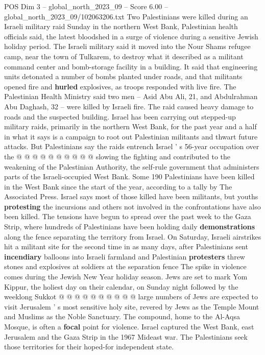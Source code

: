 \begin{textsample}{POS Dim 3 – global\_north\_2023\_09 – Score 6.00 – global\_north\_2023\_09/102063206.txt}  \label{ex:f3_pos_048}
Two Palestinians were killed during an Israeli military raid Sunday in the northern West Bank, Palestinian health officials said, the latest bloodshed in a surge of violence during a sensitive Jewish holiday period.
The Israeli military said it moved into the Nour Shams refugee camp, near the town of Tulkarem, to destroy what it described as a militant command center and bomb-storage facility in a building.
It said that engineering units detonated a number of bombs planted under roads, and that militants opened fire and \textbf{hurled} explosives, as troops responded with live fire.
The Palestinian Health Ministry said two men -- Asid Abu Ali, 21, and Abdulrahman Abu Daghash, 32 -- were killed by Israeli fire.
The raid caused heavy damage to roads and the suspected building.
Israel has been carrying out stepped-up military raids, primarily in the northern West Bank, for the past year and a half in what it says is a campaign to root out Palestinian militants and thwart future attacks.
But Palestinians say the raids entrench Israel ' s 56-year occupation over the @ @ @ @ @ @ @ @ @ @ slowing the fighting and contributed to the weakening of the Palestinian Authority, the self-rule government that administers parts of the Israeli-occupied West Bank.
Some 190 Palestinians have been killed in the West Bank since the start of the year, according to a tally by The Associated Press.
Israel says most of those killed have been militants, but youths \textbf{protesting} the incursions and others not involved in the confrontations have also been killed.
The tensions have begun to spread over the past week to the Gaza Strip, where hundreds of Palestinians have been holding daily \textbf{demonstrations} along the fence separating the territory from Israel.
On Saturday, Israeli airstrikes hit a militant site for the second time in as many days, after Palestinians sent \textbf{incendiary} balloons into Israeli farmland and Palestinian \textbf{protesters} threw stones and explosives at soldiers at the separation fence The spike in violence comes during the Jewish New Year holiday season.
Jews are set to mark Yom Kippur, the holiest day on their calendar, on Sunday night followed by the weeklong Sukkot @ @ @ @ @ @ @ @ @ @ large numbers of Jews are expected to visit Jerusalem ' s most sensitive holy site, revered by Jews as the Temple Mount and Muslims as the Noble Sanctuary.
The compound, home to the Al-Aqsa Mosque, is often a \textbf{focal} point for violence.
Israel captured the West Bank, east Jerusalem and the Gaza Strip in the 1967 Mideast war.
The Palestinians seek those territories for their hoped-for independent state.

\end{textsample}
